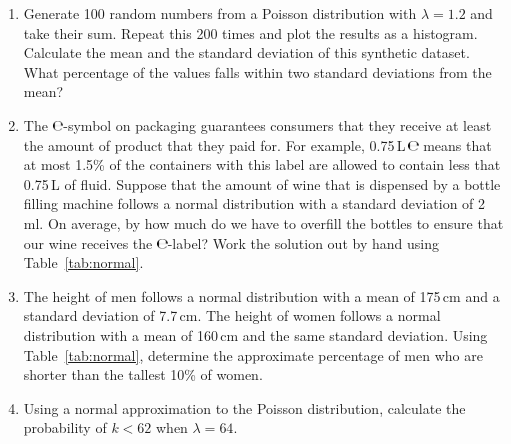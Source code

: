 \begin{enumerate}

\item Generate 100 random numbers from a Poisson distribution with
  $\lambda=1.2$ and take their sum. Repeat this 200 times and plot the
  results as a histogram. Calculate the mean and the standard
  deviation of this synthetic dataset. What percentage of the values
  falls within two standard deviations from the mean?
  
\item The \includegraphics[height=0.7em]{../figures/e.pdf}-symbol on
  packaging guarantees consumers that they receive at least the amount
  of product that they paid for. For example,
  0.75\,L\,\includegraphics[height=0.7em]{../figures/e.pdf} means that
  at most 1.5\% of the containers with this label are allowed to
  contain less that 0.75\,L of fluid.  Suppose that the amount of wine
  that is dispensed by a bottle filling machine follows a normal
  distribution with a standard deviation of 2\,ml.  On average, by how
  much do we have to overfill the bottles to ensure that our wine
  receives the \includegraphics[height=0.7em]{../figures/e.pdf}-label?
  Work the solution out by hand using Table~\ref{tab:normal}.
  
\item The height of men follows a normal distribution with a mean of
  175\,cm and a standard deviation of 7.7\,cm. The height of women
  follows a normal distribution with a mean of 160\,cm and the same
  standard deviation. Using Table~\ref{tab:normal}, determine the
  approximate percentage of men who are shorter than the tallest 10\%
  of women.

\item Using a normal approximation to the Poisson distribution,
  calculate the probability of $k<{62}$ when $\lambda=64$.
  

\end{enumerate}
